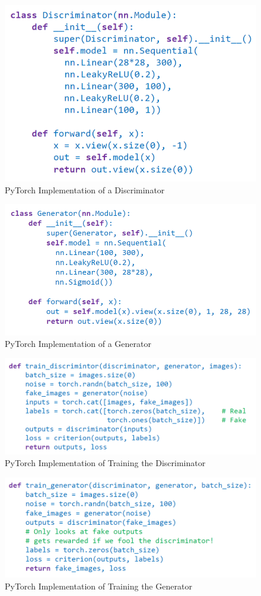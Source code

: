 \begin{figure}[h!t]
    \centering
    \includegraphics[width=0.6\linewidth]{discriminator.png}
    \caption{PyTorch Implementation of a Discriminator}
    \label{fig:enter-label}
\end{figure}
\begin{figure}[h!t]
    \centering
    \includegraphics[width=0.75\linewidth]{generator.png}
    \caption{PyTorch Implementation of a Generator}
    \label{fig:enter-label}
\end{figure}

\begin{figure}[h!t]
    \centering
    \includegraphics[width=0.75\linewidth]{trainingdiscriminator.png}
    \caption{PyTorch Implementation of Training the Discriminator}
    \label{fig:enter-label}
\end{figure}

\begin{figure}[h!t]
    \centering
    \includegraphics[width=0.75\linewidth]{traininggenerator.png}
    \caption{PyTorch Implementation of Training the Generator}
    \label{fig:enter-label}
\end{figure}

